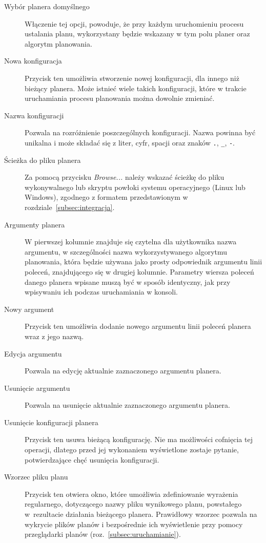 {
\setcounter{desccount}{1}
\renewcommand{\descriptionlabel}[1]%
{\protect\circled{\arabic{desccount}} \hspace\labelsep\normalfont\bfseries #1\stepcounter{desccount}}

\begin{description}
\item[Wybór planera domyślnego] Włączenie tej opcji, powoduje, że przy każdym uruchomieniu procesu ustalania planu, wykorzystany będzie wskazany w tym polu planer oraz algorytm planowania.
\item [Nowa konfiguracja] Przycisk ten umożliwia stworzenie nowej konfiguracji, dla innego niż bieżący planera. Może istnieć wiele takich konfiguracji, które w trakcie uruchamiania procesu planowania można dowolnie zmieniać.
\item [Nazwa konfiguracji] Pozwala na rozróżnienie poszczególnych konfiguracji. Nazwa powinna być unikalna i może składać się z liter, cyfr, spacji oraz znaków \texttt{.}, \texttt{\_}, \texttt{-}.
\item [Ścieżka do pliku planera] Za pomocą przycisku \emph{Browse...} należy wskazać ścieżkę do pliku wykonywalnego lub skryptu powłoki systemu operacyjnego (Linux lub Windows), zgodnego z formatem przedstawionym w rozdziale~\ref{subsec:integracja}.
\item [Argumenty planera] W pierwszej kolumnie znajduje się czytelna dla użytkownika nazwa argumentu, w szczególności nazwa wykorzystywanego algorytmu planowania, która będzie używana jako prosty odpowiednik argumentu linii poleceń, znajdującego się w drugiej kolumnie. Parametry wiersza poleceń danego planera wpisane muszą być w sposób identyczny, jak przy wpisywaniu ich podczas uruchamiania w konsoli.
\item [Nowy argument] Przycisk ten umożliwia dodanie nowego argumentu linii poleceń planera wraz z jego nazwą.
\item [Edycja argumentu] Pozwala na edycję aktualnie zaznaczonego argumentu planera.
\item [Usunięcie argumentu] Pozwala na usunięcie aktualnie zaznaczonego argumentu planera.
\item [Usunięcie konfiguracji planera] Przycisk ten usuwa bieżącą konfigurację. Nie ma możliwości cofnięcia tej operacji, dlatego przed jej wykonaniem wyświetlone zostaje pytanie, potwierdzające chęć usunięcia konfiguracji.
\item [Wzorzec pliku planu] Przycisk ten otwiera okno, które umożliwia zdefiniowanie wyrażenia regularnego, dotyczącego nazwy pliku wynikowego planu, powstałego w~rezultacie działania bieżącego planera. Prawidłowy wzorzec pozwala na wykrycie plików planów i bezpośrednie ich wyświetlenie przy pomocy przeglądarki planów (roz.~\ref{subsec:uruchamianie}).
\end{description}
}

